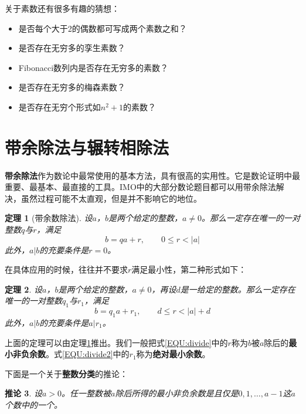 \documentclass{ctexrep}
\newcommand{\bbold}[1]{\textbf{#1}}
\newcommand{\aabs}[1]{{ \left| #1 \right| }}
\newtheorem{thrm}{定理}[section]
\newtheorem{coro}[thrm]{推论}
\begin{document}
关于素数还有很多有趣的猜想：
\begin{itemize}
\item 是否每个大于2的偶数都可写成两个素数之和？
\item 是否存在无穷多的孪生素数？
\item Fibonacci数列内是否存在无穷多的素数？
\item 是否存在无穷多的梅森素数？
\item 是否存在无穷个形式如$n^2+1$的素数？
\end{itemize}

\section{带余除法与辗转相除法}
\bbold{带余除法}作为数论中最常使用的基本方法，具有很高的实用性。它是数论证明中最重要、最基本、最直接的工具。IMO中的大部分数论题目都可以用带余除法解决，虽然过程可能不太直观，但是并不影响它的地位。

\begin{thrm}[带余数除法]\label{THRM:divide}
设$a$，$b$是两个给定的整数，$a \neq 0$。那么一定存在唯一的一对整数$q$与$r$，满足
\begin{equation}
b=qa+r, \qquad 0 \leq r < \aabs{a}\label{EQU:divide}
\end{equation}
此外，$a|b$的充要条件是$r=0$。
\end{thrm}

在具体应用的时候，往往并不要求$r$满足最小性，第二种形式如下：
\begin{thrm}
设$a$，$b$是两个给定的整数，$a \neq 0$，再设$d$是一给定的整数。那么一定存在唯一的一对整数$q_1$与$r_1$，满足
\begin{equation}
b=q_1 a+r_1, \qquad d \leq r < \aabs{a}+d \label{EQU:divide2}
\end{equation}
此外，$a|b$的充要条件是$a|r_1$。
\end{thrm}

上面的定理可以由定理\ref{THRM:divide}推出。我们一般把式\ref{EQU:divide}中的$r$称为$b$被$a$除后的\bbold{最小非负余数}。式\ref{EQU:divide2}中的$r_1$称为\bbold{绝对最小余数}。

下面是一个关于\bbold{整数分类}的推论：
\begin{coro}\label{THRM:mod}
设$a>0$。任一整数被$a$除后所得的最小非负余数是且仅是$0, 1, \dotsc,a-1$这$a$个数中的一个。
\end{coro}
\end{document}
